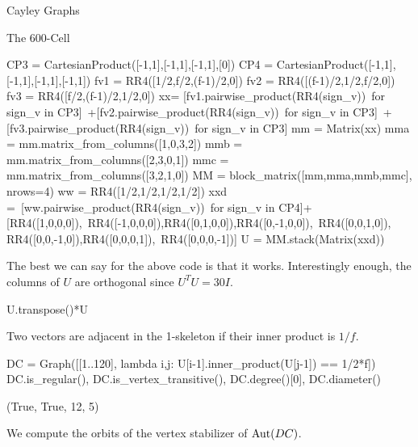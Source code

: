 \begin{chap}{Cayley Graphs}
\begin{sect}{The 600-Cell}
%
\begin{sagecode}
\begin{sageinput}
CP3 = CartesianProduct([-1,1],[-1,1],[-1,1],[0])
CP4 = CartesianProduct([-1,1],[-1,1],[-1,1],[-1,1])
fv1 = RR4([1/2,f/2,(f-1)/2,0])
fv2 = RR4([(f-1)/2,1/2,f/2,0])
fv3 = RR4([f/2,(f-1)/2,1/2,0])
xx= [fv1.pairwise_product(RR4(sign_v))\
    for sign_v in CP3]\
    +[fv2.pairwise_product(RR4(sign_v))\
    for sign_v in CP3]\
    +[fv3.pairwise_product(RR4(sign_v))\
    for sign_v in CP3]
mm = Matrix(xx)
mma = mm.matrix_from_columns([1,0,3,2])
mmb = mm.matrix_from_columns([2,3,0,1])
mmc = mm.matrix_from_columns([3,2,1,0])
MM = block_matrix([mm,mma,mmb,mmc], nrows=4)
ww = RR4([1/2,1/2,1/2,1/2])
xxd =\ 
    [ww.pairwise_product(RR4(sign_v))\
    for sign_v in CP4]+[RR4([1,0,0,0]),\  
    RR4([-1,0,0,0]),RR4([0,1,0,0]),RR4([0,-1,0,0]),\ 
    RR4([0,0,1,0]), RR4([0,0,-1,0]),RR4([0,0,0,1]),\
    RR4([0,0,0,-1])]
U = MM.stack(Matrix(xxd))
\end{sageinput}
\end{sagecode}
%
\begin{para}
The best we can say for the above code is that it works. Interestingly
enough, the columns of $U$ are orthogonal since $U^TU =30I$.
\end{para}
%
\begin{sagecode}
\begin{sageinput}
U.transpose()*U
\end{sageinput}
\begin{sageoutput}
[30  0  0  0]
[ 0 30  0  0]
[ 0  0 30  0]
[ 0  0  0 30]
\end{sageoutput}
\end{sagecode}
%
\begin{para}
Two vectors are adjacent in the 1-skeleton if their inner product is $1/f$.
\end{para}
%
\begin{sagecode}
\begin{sageinput}
DC = Graph([[1..120], lambda i,j: U[i-1].inner_product(U[j-1]) == 1/2*f])
DC.is_regular(), DC.is_vertex_transitive(), DC.degree()[0], DC.diameter()
\end{sageinput}
\begin{sageoutput}
(True, True, 12, 5)
\end{sageoutput}
\end{sagecode}
%
\begin{para}
We compute the orbits of the vertex stabilizer of $\mathrm{Aut}(DC)$.
\end{para}
%
\begin{sagecode}

\end{sagecode}
\end{sect}
\end{chap}
